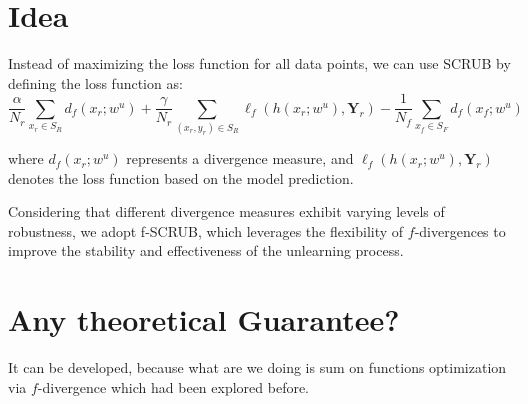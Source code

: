 \documentclass[a4paper,12pt]{article}
\begin{document}
\section{Idea}
Instead of maximizing the loss function for all data points, we can use SCRUB by defining the loss function as:
\[\frac{\alpha}{N_r} \sum_{x_r \in S_R} d_f(x_r; w^u) + \frac{\gamma}{N_r} \sum_{(x_r, y_r) \in S_R} \ell_f(h(x_r; w^u), \mathbf{Y}_r) - \frac{1}{N_f} \sum_{x_f \in S_F} d_f(x_f; w^u)\]

where \( d_f(x_r; w^u) \) represents a divergence measure, and \( \ell_f(h(x_r; w^u), \mathbf{Y}_r) \) denotes the loss function based on the model prediction.


Considering that different divergence measures exhibit varying levels of robustness, we adopt f-SCRUB, which leverages the flexibility of \( f \)-divergences to improve the stability and effectiveness of the unlearning process.


\section{Any theoretical Guarantee?}
It can be developed, because what are we doing is sum on functions optimization via $f$-divergence which had been explored before.


\printbibliography %
\end{document}
